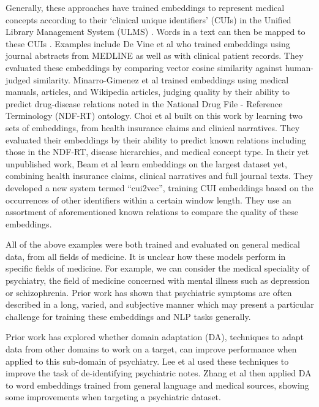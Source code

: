 \documentclass[11pt,a4paper]{article}
\begin{document}
Generally, these approaches have trained embeddings to represent medical concepts according to their `clinical unique identifiers' (CUIs) in the Unified Library Management System (ULMS) \cite{bodenreiderUnifiedMedicalLanguage2004}. Words in a text can then be mapped to these CUIs \cite{yuShortIntroductionNILE2013}. Examples include De Vine et al  who trained embeddings using journal abstracts from MEDLINE as well as with clinical patient records. They evaluated these embeddings by comparing vector cosine similarity against human-judged similarity. Minarro-Gimenez et al  trained embeddings using medical manuals, articles, and Wikipedia articles, judging quality by their ability to predict drug-disease relations noted in the National Drug File - Reference Terminology (NDF-RT) ontology. Choi et al \cite{choiLearningLowDimensionalRepresentations2016} built on this work by learning two sets of embeddings, from health insurance claims and clinical narratives. They evaluated their embeddings by their ability to predict known relations including those in the NDF-RT, disease hierarchies, and medical concept type. In their yet unpublished work, Beam et al \cite{beamClinicalConceptEmbeddings2018} learn embeddings on the largest dataset yet, combining health insurance claims, clinical narratives and full journal texts. They developed a new system termed ``cui2vec'', training CUI embeddings based on the occurrences of other identifiers within a certain window length. They use an assortment of aforementioned known relations to compare the quality of these embeddings. 

All of the above examples were both trained and evaluated on general medical data, from all fields of medicine. It is unclear how these models perform in specific fields of medicine. For example, we can consider the medical speciality of psychiatry, the field of medicine concerned with mental illness such as depression or schizophrenia. Prior work has shown that psychiatric symptoms are often described in a long, varied, and subjective manner \cite{forbushSittingPinsNeedles2013} which may present a particular challenge for training these embeddings and NLP tasks generally.

Prior work has explored whether domain adaptation (DA), techniques to adapt data from other domains to work on a target, can improve performance when applied to this sub-domain of psychiatry. Lee et al \cite{leeLeveragingExistingCorpora2018} used these techniques to improve the task of de-identifying psychiatric notes. Zhang et al \cite{zhangAdaptingWordEmbeddings2018} then applied DA to word embeddings trained from general language and medical sources, showing some improvements when targeting a psychiatric dataset. 
\end{document}
